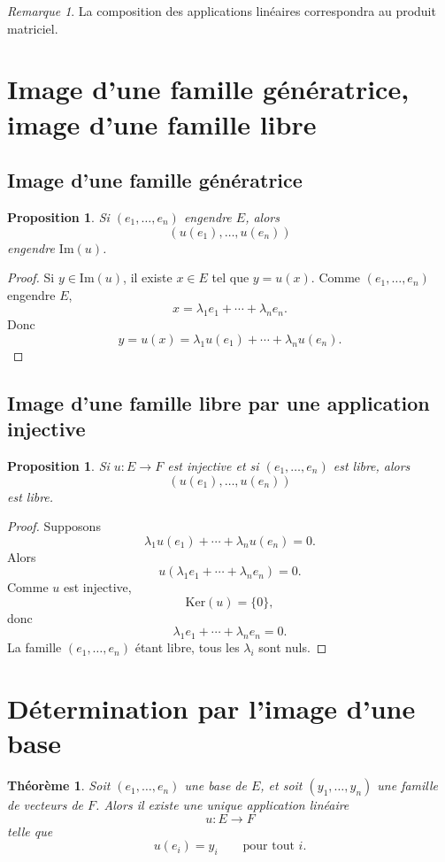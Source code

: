 \documentclass[11pt,a4paper]{article}
\newtheorem{theoreme}[definition]{Théorème}
\newtheorem{proposition}[definition]{Proposition}
\theoremstyle{remark}
\newtheorem{remarque}[definition]{Remarque}
\newcommand{\Ker}{\mathrm{Ker}}
\newcommand{\Img}{\mathrm{Im}}
\begin{document}
\begin{remarque}
La composition des applications linéaires correspondra au produit matriciel.
\end{remarque}

\section{Image d’une famille génératrice, image d’une famille libre}

\subsection{Image d’une famille génératrice}

\begin{proposition}
Si \((e_1,\dots,e_n)\) engendre \(E\), alors
\[
(u(e_1),\dots,u(e_n))
\]
engendre \(\Img(u)\).
\end{proposition}

\begin{proof}
Si \(y\in \Img(u)\), il existe \(x\in E\) tel que \(y=u(x)\). Comme \((e_1,\dots,e_n)\) engendre \(E\),
\[
x=\lambda_1e_1+\cdots+\lambda_ne_n.
\]
Donc
\[
y=u(x)=\lambda_1u(e_1)+\cdots+\lambda_nu(e_n).
\]
\end{proof}

\subsection{Image d’une famille libre par une application injective}

\begin{proposition}
Si \(u:E\to F\) est injective et si \((e_1,\dots,e_n)\) est libre, alors
\[
(u(e_1),\dots,u(e_n))
\]
est libre.
\end{proposition}

\begin{proof}
Supposons
\[
\lambda_1u(e_1)+\cdots+\lambda_nu(e_n)=0.
\]
Alors
\[
u(\lambda_1e_1+\cdots+\lambda_ne_n)=0.
\]
Comme \(u\) est injective,
\[
\Ker(u)=\{0\},
\]
donc
\[
\lambda_1e_1+\cdots+\lambda_ne_n=0.
\]
La famille \((e_1,\dots,e_n)\) étant libre, tous les \(\lambda_i\) sont nuls.
\end{proof}

\section{Détermination par l’image d’une base}

\begin{theoreme}
Soit \((e_1,\dots,e_n)\) une base de \(E\), et soit \((y_1,\dots,y_n)\) une famille de vecteurs de \(F\). Alors il existe une unique application linéaire
\[
u:E\to F
\]
telle que
\[
u(e_i)=y_i
\qquad \text{pour tout } i.
\]
\end{theoreme}
\end{document}
